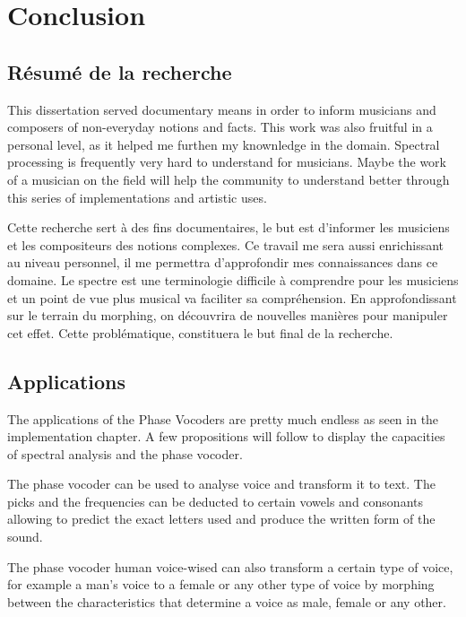 \chapter{Conclusion}

\label{ch:conclusions}

\section{Résumé de la recherche}

This dissertation served documentary means in order to inform musicians and composers of non-everyday notions and facts. This work was also fruitful in a personal level, as it helped me furthen my knownledge in the domain. Spectral processing is frequently very hard to understand for musicians. Maybe the work of a musician on the field will help the community to understand better through this series of implementations and artistic uses.


 Cette recherche sert à des fins documentaires, le but est d'informer les musiciens et les compositeurs des notions complexes. Ce travail me sera aussi enrichissant au niveau personnel, il me permettra d'approfondir mes connaissances dans ce domaine. Le spectre est une terminologie difficile à comprendre pour les musiciens et un point de vue plus musical va faciliter sa compréhension. En approfondissant sur le terrain du morphing, on découvrira de nouvelles manières pour manipuler cet effet. Cette problématique, constituera le but final de la recherche. 

\section{Applications}

The applications of the Phase Vocoders are pretty much endless as seen in the implementation chapter. A few propositions will follow to display the capacities of spectral analysis and the phase vocoder.

The phase vocoder can be used to analyse voice and transform it to text. The picks and the frequencies can be deducted to certain vowels and consonants allowing to predict the exact letters used and produce the written form of the sound.

The phase vocoder human voice-wised can also transform a certain type of voice, for example a man's voice to a female or any other type of voice by morphing between the characteristics that determine a voice as male, female or any other.

